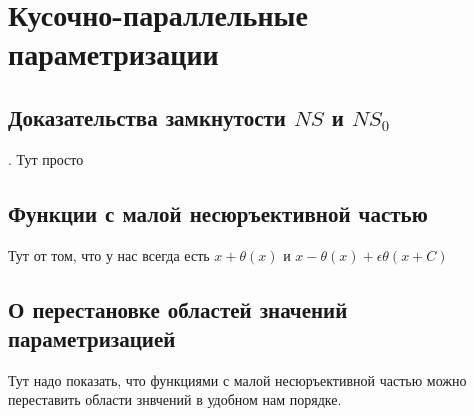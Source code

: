 \documentclass[main.tex]{subfiles}
\begin{document}
\section{Кусочно-параллельные параметризации}
\subsection{Доказательства замкнутости $NS$ и $NS_0$}.
Тут просто

\subsection{Функции с малой несюръективной частью}
Тут от том, что у нас всегда есть $x + \theta(x)$ и $x-\theta(x) + \epsilon \theta(x+C)$

\subsection{О перестановке областей значений параметризацией}
Тут надо показать, что функциями с малой несюръективной частью можно переставить области знвчений в удобном нам порядке.
  
\end{document}

